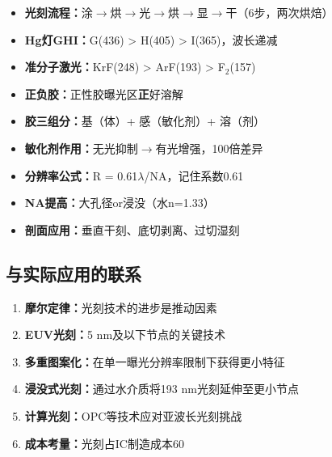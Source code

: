 \documentclass[UTF8,12pt,a4paper]{ctexart}
\begin{document}
\begin{itemize}
    \item \textbf{光刻流程：}涂$\rightarrow$烘$\rightarrow$光$\rightarrow$烘$\rightarrow$显$\rightarrow$干（6步，两次烘焙）
    \item \textbf{Hg灯GHI：}G(436) > H(405) > I(365)，波长递减
    \item \textbf{准分子激光：}KrF(248) > ArF(193) > F$_2$(157)
    \item \textbf{正负胶：}正性胶曝光区\textbf{正}好溶解
    \item \textbf{胶三组分：}基（体）+ 感（敏化剂）+ 溶（剂）
    \item \textbf{敏化剂作用：}无光抑制$\rightarrow$有光增强，100倍差异
    \item \textbf{分辨率公式：}R = 0.61$\lambda$/NA，记住系数0.61
    \item \textbf{NA提高：}大孔径or浸没（水n=1.33）
    \item \textbf{剖面应用：}垂直干刻、底切剥离、过切湿刻
\end{itemize}

\subsection{与实际应用的联系}

\begin{enumerate}
    \item \textbf{摩尔定律：}光刻技术的进步是推动因素
    \item \textbf{EUV光刻：}5 nm及以下节点的关键技术
    \item \textbf{多重图案化：}在单一曝光分辨率限制下获得更小特征
    \item \textbf{浸没式光刻：}通过水介质将193 nm光刻延伸至更小节点
    \item \textbf{计算光刻：}OPC等技术应对亚波长光刻挑战
    \item \textbf{成本考量：}光刻占IC制造成本60%
\end{enumerate}
\end{document}
